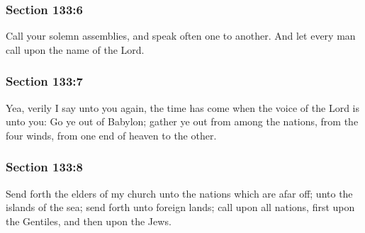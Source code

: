 	\subsubsection{Section 133:6} %
		\label{DC133-6}

		Call your solemn assemblies, and speak often one to another.  And let every man call upon the name of the Lord.


	\subsubsection{Section 133:7} %
		\label{DC133-7}

		Yea, verily I say unto you again, the time has come when the voice of the Lord is unto you: Go ye out of Babylon; gather ye out from among the nations, from the four winds, from one end of heaven to the other.


	\subsubsection{Section 133:8} %
		\label{DC133-8}

		Send forth the elders of my church unto the nations which are afar off; unto the islands of the sea; send forth unto foreign lands; call upon all nations, first upon the Gentiles, and then upon the Jews.



